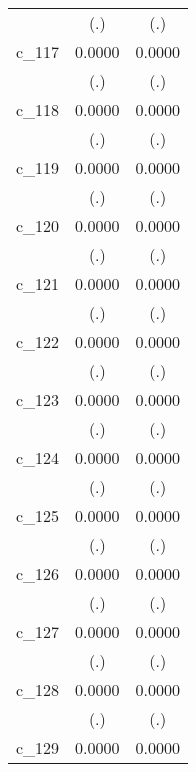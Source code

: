 {\begin{tabular}{l*{2}{c}}
            &         (.)        &         (.)        \\
[1em]
c\_117       &      0.0000        &      0.0000        \\
            &         (.)        &         (.)        \\
[1em]
c\_118       &      0.0000        &      0.0000        \\
            &         (.)        &         (.)        \\
[1em]
c\_119       &      0.0000        &      0.0000        \\
            &         (.)        &         (.)        \\
[1em]
c\_120       &      0.0000        &      0.0000        \\
            &         (.)        &         (.)        \\
[1em]
c\_121       &      0.0000        &      0.0000        \\
            &         (.)        &         (.)        \\
[1em]
c\_122       &      0.0000        &      0.0000        \\
            &         (.)        &         (.)        \\
[1em]
c\_123       &      0.0000        &      0.0000        \\
            &         (.)        &         (.)        \\
[1em]
c\_124       &      0.0000        &      0.0000        \\
            &         (.)        &         (.)        \\
[1em]
c\_125       &      0.0000        &      0.0000        \\
            &         (.)        &         (.)        \\
[1em]
c\_126       &      0.0000        &      0.0000        \\
            &         (.)        &         (.)        \\
[1em]
c\_127       &      0.0000        &      0.0000        \\
            &         (.)        &         (.)        \\
[1em]
c\_128       &      0.0000        &      0.0000        \\
            &         (.)        &         (.)        \\
[1em]
c\_129       &      0.0000        &      0.0000        \\

\end{tabular}}
